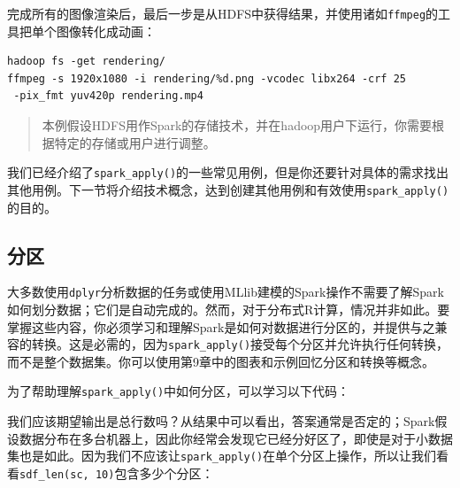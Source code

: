 \documentclass[
]{article}
\newenvironment{Shaded}{\begin{snugshade}}{\end{snugshade}}
\newcommand{\CommentTok}[1]{\textcolor[rgb]{0.56,0.35,0.01}{\textit{#1}}}
\newcommand{\DecValTok}[1]{\textcolor[rgb]{0.00,0.00,0.81}{#1}}
\newcommand{\ErrorTok}[1]{\textcolor[rgb]{0.64,0.00,0.00}{\textbf{#1}}}
\newcommand{\KeywordTok}[1]{\textcolor[rgb]{0.13,0.29,0.53}{\textbf{#1}}}
\newcommand{\NormalTok}[1]{#1}
\newcommand{\OperatorTok}[1]{\textcolor[rgb]{0.81,0.36,0.00}{\textbf{#1}}}
\newcommand{\StringTok}[1]{\textcolor[rgb]{0.31,0.60,0.02}{#1}}
\begin{document}
完成所有的图像渲染后，最后一步是从HDFS中获得结果，并使用诸如\texttt{ffmpeg}的工具把单个图像转化成动画：

\begin{verbatim}
hadoop fs -get rendering/
ffmpeg -s 1920x1080 -i rendering/%d.png -vcodec libx264 -crf 25
 -pix_fmt yuv420p rendering.mp4
\end{verbatim}

\begin{quote}
本例假设HDFS用作Spark的存储技术，并在hadoop用户下运行，你需要根据特定的存储或用户进行调整。
\end{quote}

我们已经介绍了\texttt{spark\_apply()}的一些常见用例，但是你还要针对具体的需求找出其他用例。下一节将介绍技术概念，达到创建其他用例和有效使用\texttt{spark\_apply()}的目的。

\hypertarget{ux5206ux533a-1}{%
\subsection{分区}\label{ux5206ux533a-1}}

大多数使用\texttt{dplyr}分析数据的任务或使用MLlib建模的Spark操作不需要了解Spark如何划分数据；它们是自动完成的。然而，对于分布式R计算，情况并非如此。要掌握这些内容，你必须学习和理解Spark是如何对数据进行分区的，并提供与之兼容的转换。这是必需的，因为\texttt{spark\_apply()}接受每个分区并允许执行任何转换，而不是整个数据集。你可以使用第9章中的图表和示例回忆分区和转换等概念。

为了帮助理解\texttt{spark\_apply()}中如何分区，可以学习以下代码：

\begin{Shaded}
\end{Shaded}

我们应该期望输出是总行数吗？从结果中可以看出，答案通常是否定的；Spark假设数据分布在多台机器上，因此你经常会发现它已经分好区了，即使是对于小数据集也是如此。因为我们不应该让\texttt{spark\_apply()}在单个分区上操作，所以让我们看看\texttt{sdf\_len(sc,\ 10)}包含多少个分区：
\end{document}
